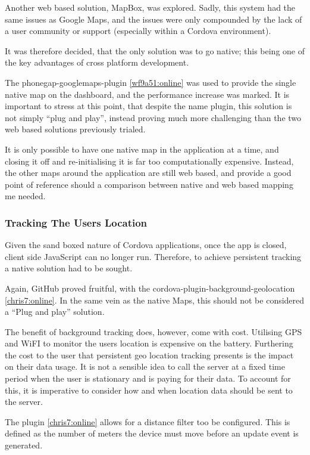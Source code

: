 \documentclass[a4paper]{article}
\begin{document}
Another web based solution, MapBox, was explored. Sadly, this system had the same issues as Google Maps, and the issues were only compounded by the lack of a user community or support (especially within a Cordova environment).

It was therefore decided, that the only solution was to go native; this being one of the key advantages of cross platform development.

The phonegap-googlemaps-plugin \ref{wf9a51:online} was used to provide the single native map on the dashboard, and the performance increase was marked. It is important to stress at this point, that despite the name plugin, this solution is not simply ``plug and play'', instead proving much more challenging than the two web based solutions previously trialed. 

It is only possible to have one native map in the application at a time, and closing it off and re-initialising it is far too computationally expensive. Instead, the other maps around the application are still web based, and provide a good point of reference should a comparison between native and web based mapping me needed.

\subsubsection{Tracking The Users Location}

Given the sand boxed nature of Cordova applications, once the app is closed, client side JavaScript can no longer run.
Therefore, to achieve persistent tracking a native solution had to be sought. 

Again, GitHub proved fruitful, with the cordova-plugin-background-geolocation \ref{chris7:online}. In the same vein as the native Maps, this should not be considered a ``Plug and play'' solution. 

The benefit of background tracking does, however, come with  cost. Utilising GPS and WiFI to monitor the users location is expensive on the battery. Furthering the cost to the user that persistent geo location tracking presents is the impact on their data usage. It is not a sensible idea to call the server at a fixed time period when the user is stationary and is paying for their data.  To account for this, it is imperative to consider how and when location data should be sent to the server.

The plugin \ref{chris7:online} allows for a distance filter too be configured. This is defined as the number of meters the device must move before an update event is generated.
\end{document}
